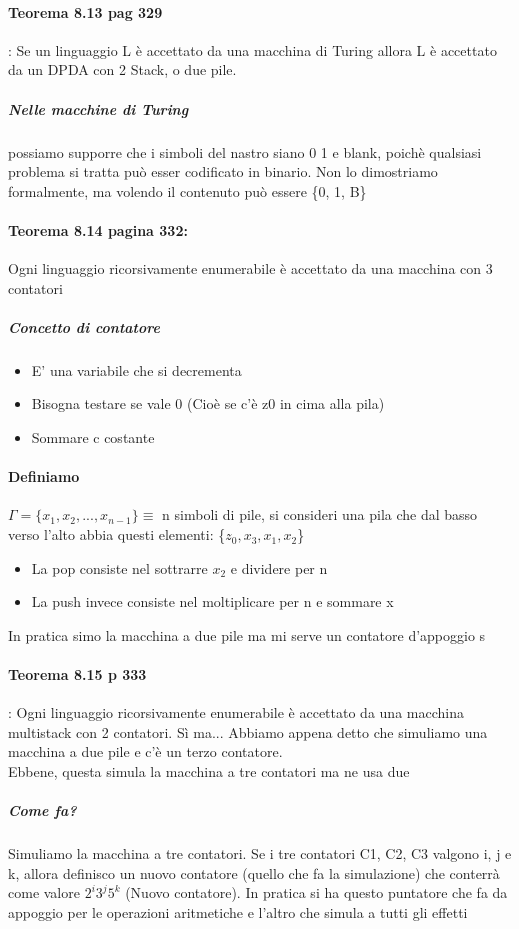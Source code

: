 \documentclass[12pt, a4paper, openany, oneside]{book}
\begin{document}
\paragraph{Teorema 8.13 pag 329}: Se un linguaggio L è accettato da una macchina
di Turing allora L è accettato da un DPDA con 2 Stack, o due pile.
\subparagraph{Nelle macchine di Turing} possiamo supporre che i simboli del nastro
siano 0 1 e blank, poichè qualsiasi problema si tratta può esser codificato in
binario. Non lo dimostriamo formalmente, ma volendo il contenuto può essere \{0, 1, B\}	 
\paragraph{Teorema 8.14 pagina 332: }Ogni linguaggio ricorsivamente enumerabile
è accettato da una macchina con 3 contatori
\subparagraph{Concetto di contatore}
\begin{itemize}
		\item E' una variabile che si decrementa
		\item Bisogna testare se vale 0 (Cioè se c'è z0 in cima alla pila)
		\item Sommare c costante
\end{itemize}	
\paragraph{Definiamo} $\Gamma = \{x_{1}, x_{2}, ..., x_{n-1}\} \equiv$ n simboli
di pile,
si consideri una pila che dal basso verso l'alto abbia questi elementi: \{$z_{0}, x_{3}, x_{1}, x_{2}$\}
\begin{itemize}
	\item La pop consiste nel sottrarre $x_{2}$ e dividere per n
	\item La push invece consiste nel moltiplicare per n e sommare x
\end{itemize}
In pratica simo la macchina a due pile ma mi serve un contatore d'appoggio s
\paragraph{Teorema 8.15 p 333}: Ogni linguaggio ricorsivamente enumerabile è 
accettato da una macchina multistack con 2 contatori. Sì ma... Abbiamo appena
detto che simuliamo una macchina a due pile e c'è un terzo contatore.\\
Ebbene, questa simula la macchina a tre contatori ma ne usa due
\subparagraph{Come fa?} Simuliamo la macchina a tre contatori. Se i tre contatori
C1, C2, C3 valgono i, j e k, allora definisco un nuovo contatore (quello che
fa la simulazione) che conterrà come valore $2^{i} 3^{j} 5^{k}$ (Nuovo contatore).
In pratica si ha questo puntatore che fa da appoggio per le operazioni aritmetiche
e l'altro che simula a tutti gli effetti
\end{document}
